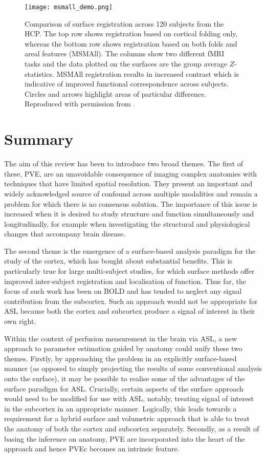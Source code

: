 \begin{figure}[H]
\centering
\texttt{[image: msmall\_demo.png]}
\caption{Comparison of surface registration across 120 subjects from the HCP. The top row shows registration based on cortical folding only, whereas the bottom row shows registration based on both folds and areal features (MSMAll). The columns show two different fMRI tasks and the data plotted on the surfaces are the group average $Z$-statistics. MSMAll registration results in increased contrast which is indicative of improved functional correspondence across subjects. Circles and arrows highlight areas of particular difference. Reproduced with permission from \cite{Glasser2016a}.}
\label{msmall_demo}
\end{figure}


\section{Summary}

The aim of this review has been to introduce two broad themes. The first of these, PVE, are an unavoidable consequence of imaging complex anatomies with techniques that have limited spatial resolution. They present an important and widely acknowledged source of confound across multiple modalities and remain a problem for which there is no consensus solution. The importance of this issue is increased when it is desired to study structure and function simultaneously and longitudinally, for example when investigating the structural and physiological changes that accompany brain disease. 

The second theme is the emergence of a surface-based analysis paradigm for the study of the cortex, which has bought about substantial benefits. This is particularly true for large multi-subject studies, for which surface methods offer improved inter-subject registration and localisation of function. Thus far, the focus of such work has been on BOLD and has tended to neglect any signal contribution from the subcortex. Such an approach would not be appropriate for ASL because both the cortex and subcortex produce a signal of interest in their own right. 

Within the context of perfusion measurement in the brain via ASL, a new approach to parameter estimation guided by anatomy could unify these two themes. Firstly, by approaching the problem in an explicitly surface-based manner (as opposed to simply projecting the results of some conventional analysis onto the surface), it may be possible to realise some of the advantages of the surface paradigm for ASL. Crucially, certain aspects of the surface approach would need to be modified for use with ASL, notably, treating signal of interest in the subcortex in an appropriate manner. Logically, this leads towards a requirement for a hybrid surface and volumetric approach that is able to treat the anatomy of both the cortex and subcortex separately. Secondly, as a result of basing the inference on anatomy, PVE are incorporated into the heart of the approach and hence PVEc becomes an intrinsic feature. 

